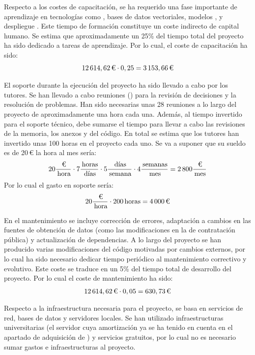Respecto a los costes de capacitación, se ha requerido una fase importante de aprendizaje en tecnologías como , bases de datos vectoriales, modelos ,  y despliegue . Este tiempo de formación constituye un coste indirecto de capital humano. Se estima que aproximadamente un 25\% del tiempo total del proyecto ha sido dedicado a tareas de aprendizaje. Por lo cual, el coste de capacitación ha sido:
$$
12\,614,62\,\text{\texteuro} \cdot 0,25
= 3\,153,66\,\text{\texteuro}
$$

El soporte durante la ejecución del proyecto ha sido llevado a cabo por los tutores. Se han llevado a cabo reuniones () para la revisión de decisiones y la resolución de problemas. Han sido necesarias unas 28 reuniones a lo largo del proyecto de aproximadamente una hora cada una. Además, al tiempo invertido para el soporte técnico, debe sumarse el tiempo para llevar a cabo las revisiones de la memoria, los anexos y del código. En total se estima que los tutores han invertido unas 100 horas en el proyecto cada uno. Se va a suponer que su sueldo es de 20\,€ la hora al mes sería:
$$ 
20\frac{\,\text{\texteuro}}{\,\text{hora}} \cdot 7\frac{\,\text{horas}}{\,\text{días}} \cdot 5\frac{\,\text{días}}{\,\text{semana}} \cdot 4\frac{\,\text{semanas}}{\,\text{mes}} 
= 2\,800\frac{\,\text{\texteuro}}{\,\text{mes}}
$$
Por lo cual el gasto en soporte sería:
$$ 
20\frac{\,\text{\texteuro}}{\,\text{hora}} \cdot 200\,\text{horas}
= 4\,000\,\text{\texteuro}
$$

En el mantenimiento se incluye corrección de errores, adaptación a cambios en las fuentes de obtención de datos (como las modificaciones en la  de contratación pública) y actualización de dependencias. A lo largo del proyecto se han producido varias modificaciones del código motivadas por cambios externos, por lo cual ha sido necesario dedicar tiempo periódico al mantenimiento correctivo y evolutivo. Este coste se traduce en un 5\% del tiempo total de desarrollo del proyecto. Por lo cual el coste de mantenimiento ha sido:
$$
12\,614,62\,\text{\texteuro} \cdot 0,05
= 630,73\,\text{\texteuro}
$$

Respecto a la infraestructura necesaria para el proyecto, se basa en servicios de red, bases de datos y servidores locales. Se han utilizado infraestructuras universitarias (el servidor cuya amortización ya se ha tenido en cuenta en el apartado de adquisición de ) y servicios gratuitos, por lo cual no es necesario sumar gastos e infraestructuras al proyecto. 

